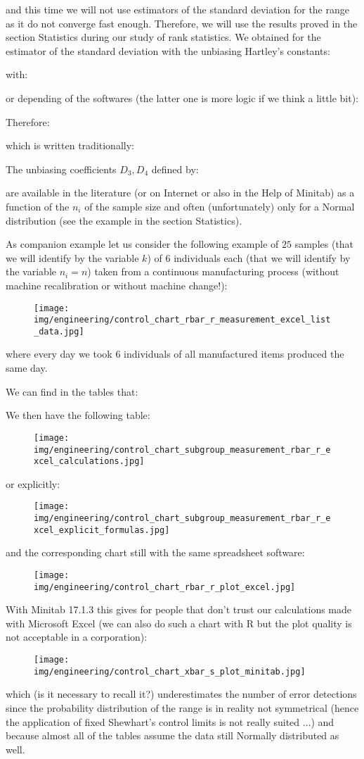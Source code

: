 	and this time we will not use estimators of the standard deviation for the range as it do not converge fast enough. Therefore, we will use the results proved in the section Statistics during our study of rank statistics. We obtained for the estimator of the standard deviation with the unbiasing Hartley's constants:
	
	with:
	
	or depending of the softwares (the latter one is more logic if we think a little bit):
	
	Therefore:
	
	which is written traditionally:
	
	The unbiasing coefficients $D_3,D_4$ defined by:
	
	are available in the literature (or on Internet or also in the Help of Minitab) as a function of the $n_i$ of the sample size and often (unfortunately) only for a Normal distribution (see the example in the section Statistics).
	
	As companion example let us consider the following example of $25$ samples (that we will identify by the variable $k$) of $6$ individuals each (that we will identify by the variable $n_i=n$) taken from a continuous manufacturing process (without machine recalibration or without machine change!):
	\begin{figure}[H]
		\centering
		\texttt{[image: img/engineering/control\_chart\_rbar\_r\_measurement\_excel\_list\_data.jpg]}
	\end{figure}
	where every day we took $6$ individuals of all manufactured items produced the same day.
	
	We can find in the tables that:
	
	We then have the following table:
	\begin{figure}[H]
		\centering
		\texttt{[image: img/engineering/control\_chart\_subgroup\_measurement\_rbar\_r\_excel\_calculations.jpg]}
	\end{figure}
	or explicitly:
	\begin{figure}[H]
		\centering
		\texttt{[image: img/engineering/control\_chart\_subgroup\_measurement\_rbar\_r\_excel\_explicit\_formulas.jpg]}
	\end{figure}
	and the corresponding chart still with the same spreadsheet software:
	\begin{figure}[H]
		\centering
		\texttt{[image: img/engineering/control\_chart\_rbar\_r\_plot\_excel.jpg]}
	\end{figure}
	With Minitab 17.1.3 this gives for people that don't trust our calculations made with Microsoft Excel (we can also do such a chart with R but the plot quality is not acceptable in a corporation):
	\begin{figure}[H]
		\centering
		\texttt{[image: img/engineering/control\_chart\_xbar\_s\_plot\_minitab.jpg]}
	\end{figure}
	which (is it necessary to recall it?) underestimates the number of error detections since the probability distribution of the range is in reality not symmetrical (hence the application of fixed Shewhart's control limits is not really suited ...) and because almost all of the tables assume the data still Normally distributed as well.
	
